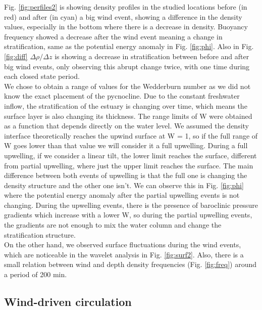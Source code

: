 \documentclass[tesis.tex]{subfiles}
\begin{document}
Fig. \ref{fig:perfiles2} is showing density profiles in the studied locations before (in red) and after (in cyan) a big wind event, showing a difference in the density values, especially in the bottom where there is a decrease in density. Buoyancy frequency showed a decrease after the wind event meaning a change in stratification, same as the potential energy anomaly in Fig. \ref{fig:phi}. Also in Fig. \ref{fig:diff} $\Delta \rho/\Delta z$ is showing a decrease in stratification between before and after big wind events, only observing this abrupt change twice, with one time during each closed state period.\\

We chose to obtain a range of values for the Wedderburn number as we did not know the exact placement of the pycnocline. Due to the constant freshwater inflow, the stratification of the estuary is changing over time, which means the surface layer is also changing its thickness. The range limits of W were obtained as a function that depends directly on the water level. We assumed the density interface theoretically reaches the upwind surface at W = 1, so if the full range of W goes lower than that value we will consider it a full upwelling. During a full upwelling, if we consider a linear tilt, the lower limit reaches the surface, different from partial upwelling, where just the upper limit reaches the surface. The main difference between both events of upwelling is that the full one is changing the density structure and the other one isn't. We can observe this in Fig. \ref{fig:phi} where the potential energy anomaly after the partial upwelling events is not changing. During the upwelling events, there is the presence of baroclinic pressure gradients which increase with a lower W, so during the partial upwelling events, the gradients are not enough to mix the water column and change the stratification structure.\\

On the other hand, we observed surface fluctuations during the wind events, which are noticeable in the wavelet analysis in Fig. \ref{fig:surf2}. Also, there is a small relation between wind and depth density frequencies (Fig. \ref{fig:freq}) around a period of 200 min.\\

\subsection{Wind-driven circulation}
\end{document}
